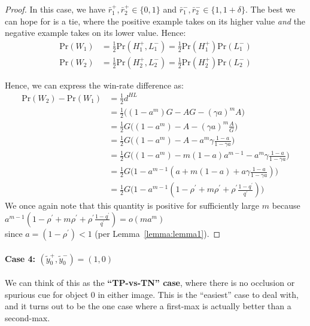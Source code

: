 \begin{proof}
In this case, we have $\bar{r}_1^{+}, \bar{r}_2^{+} \in \{0, 1\}$ and $\bar{r}_1^{-}, \bar{r}_2^{-} \in \{1, 1 + \delta\}$. The best we can hope for is a tie, where the positive example takes on its higher value \textit{and} the negative example takes on its lower value. Hence:
\begin{align}
\textrm{Pr}(W_1) &= \frac{1}{2} \textrm{Pr}(H_1^{+}, L_1^{-}) = \frac{1}{2} \textrm{Pr}(H_1^{+}) \textrm{Pr}(L_1^{-})\\
\textrm{Pr}(W_2) &= \frac{1}{2} \textrm{Pr}(H_2^{+}, L_2^{-}) = \frac{1}{2} \textrm{Pr}(H_2^{+}) \textrm{Pr}(L_2^{-})
\end{align}

Hence, we can express the win-rate difference as:
\begin{align}
\textrm{Pr}(W_2) - \textrm{Pr}(W_1) &= \frac{1}{2} d^{HL}\\
&= \frac{1}{2} \Big(  (1 - a^m) G - AG - (\gamma a)^m A  \Big)\\
&= \frac{1}{2} G \Big(  (1 - a^m)  - A - (\gamma a)^m \frac{A}{G}  \Big)\\
&= \frac{1}{2} G \Big(  (1 - a^m)  - A -  a^m \gamma \frac{1 - a}{1 - \gamma a}  \Big)\\
&= \frac{1}{2} G \Big(  (1 - a^m)  - m (1 - a) a^{m-1} -  a^m \gamma \frac{1 - a}{1 - \gamma a}  \Big)\\
&= \frac{1}{2} G \Big(1 - a^{m-1}(a  + m (1 - a) +  a \gamma \frac{1 - a}{1 - \gamma a})  \Big)\\
&= \frac{1}{2} G \Big(1 - a^{m-1}(1 - \rho^{\prime}  + m \rho^{\prime} +  \rho^{\prime} \frac{1 - q^{\prime}}{q^{\prime}})  \Big)
\end{align}
We once again note that this quantity is positive for sufficiently large $m$ because $a^{m-1}(1\! -\! \rho^{\prime}\!  +\! m \rho^{\prime}\! +\!  \rho^{\prime} \frac{1\! -\! q^{\prime}}{q^{\prime}}) = o(m a^m)$\\ since $a = (1 - \rho^{\prime}) < 1$ (per Lemma~\ref{lemma:lemma1}).
\end{proof}

\paragraph{Case 4: $(\tilde{y}_0^{+}, \tilde{y}_0^{-}) = (1,0)$} We can think of this as the \textbf{``TP-vs-TN'' case}, where there is no occlusion or spurious cue for object $0$ in either image. This is the ``easiest'' case to deal with, and it turns out to be the one case where a first-max is actually better than a second-max.


